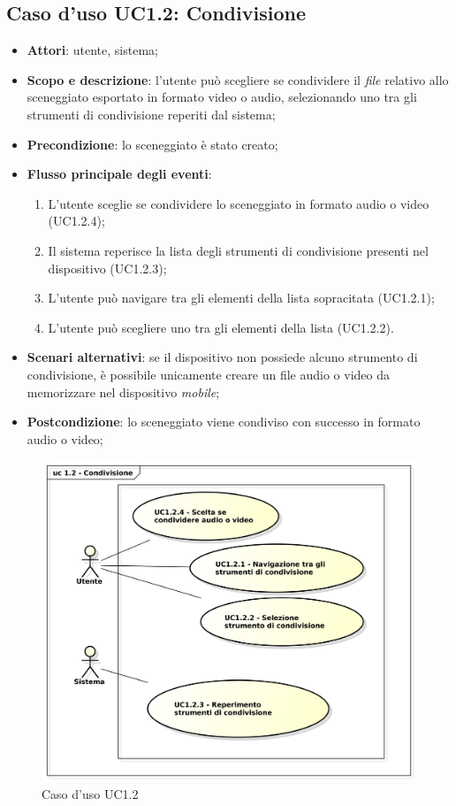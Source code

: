 \subsection{Caso d'uso UC1.2: Condivisione}
\label{sec:UC1.2}

\begin{itemize}
\item \textbf{Attori}: utente, sistema;
\item \textbf{Scopo e descrizione}: l'utente può scegliere se condividere il \textit{file} relativo allo sceneggiato esportato in formato video o audio, selezionando uno tra gli strumenti di condivisione reperiti dal sistema;
\item \textbf{Precondizione}: lo sceneggiato è stato creato;
\item \textbf{Flusso principale degli eventi}:
\begin{enumerate}
\item L'utente sceglie se condividere lo sceneggiato in formato audio o video (UC1.2.4);
\item Il sistema reperisce la lista degli strumenti di condivisione presenti nel dispositivo (UC1.2.3);
\item L'utente può navigare tra gli elementi della lista sopracitata (UC1.2.1);
\item L'utente può scegliere uno tra gli elementi della lista (UC1.2.2).
\end{enumerate}
\item \textbf{Scenari alternativi}: se il dispositivo non possiede alcuno strumento di condivisione, è possibile unicamente creare un file audio o video da memorizzare nel dispositivo \textit{mobile}; 
\item \textbf{Postcondizione}: lo sceneggiato viene condiviso con successo in formato audio o video; 
\end{itemize}
\begin{figure}[htbp]
\centering
\includegraphics[scale=0.5]{immagini/uc1_2_condivisione.png}
\captionsetup{labelfont=bf}
\caption{Caso d'uso UC1.2}
\end{figure}
\newpage

